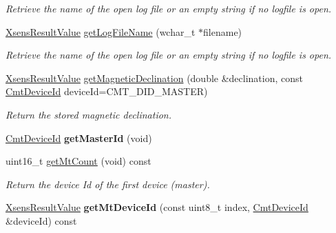 \begin{DoxyCompactItemize}
\begin{DoxyCompactList}\small\item\em \-Retrieve the name of the open log file or an empty string if no logfile is open. \end{DoxyCompactList}\item 
\hypertarget{classxsens_1_1Cmt3_ab8520b5cb69b49fcfbb1f2fd6f521379}{\hyperlink{group__enums_ga822a2260a20af524029eef9e9a51ff6f}{\-Xsens\-Result\-Value} \hyperlink{classxsens_1_1Cmt3_ab8520b5cb69b49fcfbb1f2fd6f521379}{get\-Log\-File\-Name} (wchar\-\_\-t $\ast$filename)}\label{classxsens_1_1Cmt3_ab8520b5cb69b49fcfbb1f2fd6f521379}

\begin{DoxyCompactList}\small\item\em \-Retrieve the name of the open log file or an empty string if no logfile is open. \end{DoxyCompactList}\item 
\hyperlink{group__enums_ga822a2260a20af524029eef9e9a51ff6f}{\-Xsens\-Result\-Value} \hyperlink{classxsens_1_1Cmt3_a905e3ccce0c7cace1ec2c9deee20f75b}{get\-Magnetic\-Declination} (double \&declination, const \hyperlink{cmtdef_8h_a2e3b6a17360828d440ee848959918af2}{\-Cmt\-Device\-Id} device\-Id=\-C\-M\-T\-\_\-\-D\-I\-D\-\_\-\-M\-A\-S\-T\-E\-R)
\begin{DoxyCompactList}\small\item\em \-Return the stored magnetic declination. \end{DoxyCompactList}\item 
\hypertarget{classxsens_1_1Cmt3_a6873c8bddc9a830a8e519f331f56af35}{\hyperlink{cmtdef_8h_a2e3b6a17360828d440ee848959918af2}{\-Cmt\-Device\-Id} {\bfseries get\-Master\-Id} (void)}\label{classxsens_1_1Cmt3_a6873c8bddc9a830a8e519f331f56af35}

\item 
uint16\-\_\-t \hyperlink{classxsens_1_1Cmt3_a1a5d499a50125883037f34bd34e88c82}{get\-Mt\-Count} (void) const 
\begin{DoxyCompactList}\small\item\em \-Return the device \-Id of the first device (master). \end{DoxyCompactList}\item 
\hypertarget{classxsens_1_1Cmt3_addefcb1ecc0a1ff017dce0d5b1b6d2e6}{\hyperlink{group__enums_ga822a2260a20af524029eef9e9a51ff6f}{\-Xsens\-Result\-Value} {\bfseries get\-Mt\-Device\-Id} (const uint8\-\_\-t index, \hyperlink{cmtdef_8h_a2e3b6a17360828d440ee848959918af2}{\-Cmt\-Device\-Id} \&device\-Id) const }\label{classxsens_1_1Cmt3_addefcb1ecc0a1ff017dce0d5b1b6d2e6}


\end{DoxyCompactItemize}
